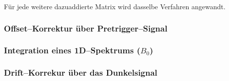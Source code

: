 \documentclass{article}
\begin{document}
Für jede weitere dazuaddierte Matrix wird dasselbe Verfahren angewandt.


\subsubsection{Offset--Korrektur über Pretrigger--Signal}


\subsubsection{Integration eines 1D--Spektrums ($B_0$)}


\subsubsection{Drift--Korrekur über das Dunkelsignal}



\end{document}
